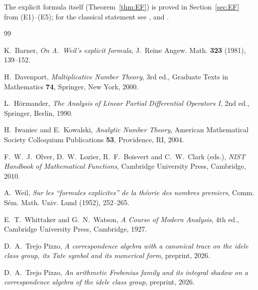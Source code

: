\documentclass[11pt]{amsart}
\theoremstyle{definition}
\theoremstyle{remark}
\begin{document}
The explicit formula itself (Theorem~\ref{thm:EF}) is proved in
Section~\ref{sec:EF} from (E1)--(E5); for the classical statement see
\cite{Weil1952}, \cite{Barner1981} and \cite[\S5.5]{IK}.

\begin{thebibliography}{99}

 K.~Barner,
\emph{On A.~Weil's explicit formula},
J.~Reine Angew. Math. \textbf{323} (1981), 139--152.

 H.~Davenport,
\emph{Multiplicative Number Theory}, 3rd ed.,
Graduate Texts in Mathematics \textbf{74}, Springer, New York, 2000.

 L.~H\"ormander,
\emph{The Analysis of Linear Partial Differential Operators I}, 2nd ed.,
Springer, Berlin, 1990.

 H.~Iwaniec and E.~Kowalski,
\emph{Analytic Number Theory},
American Mathematical Society Colloquium Publications \textbf{53},
Providence, RI, 2004.

 F.~W.~J.~Olver, D.~W.~Lozier, R.~F.~Boisvert and C.~W.~Clark
(eds.), \emph{NIST Handbook of Mathematical Functions},
Cambridge University Press, Cambridge, 2010.

 A.~Weil,
\emph{Sur les ``formules explicites'' de la th\'eorie des nombres premiers},
Comm. S\'em. Math. Univ. Lund (1952), 252--265.

 E.~T.~Whittaker and G.~N.~Watson,
\emph{A Course of Modern Analysis}, 4th ed.,
Cambridge University Press, Cambridge, 1927.

 D.~A.~Trejo Pizzo,
\emph{A correspondence algebra with a canonical trace on the idele class
group, its Tate symbol and its numerical form}, preprint, 2026.

 D.~A.~Trejo Pizzo,
\emph{An arithmetic Frobenius family and its integral shadow on a
correspondence algebra of the idele class group}, preprint, 2026.

\end{thebibliography}
\end{document}
